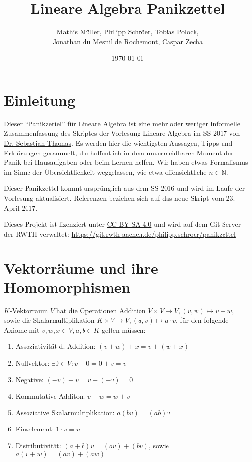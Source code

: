 \documentclass[a4paper,parskip=half*,DIV=15,fontsize=11pt]{scrartcl}
\title{Lineare Algebra Panikzettel}
\author{Mathis Müller, Philipp Schröer, Tobias Polock,\\ Jonathan du Mesnil de Rochemont, Caspar Zecha}
\date{\today}
\begin{document}
\maketitle

\setcounter{tocdepth}{2}
\tableofcontents

\section{Einleitung}

Dieser ``Panikzettel'' für Lineare Algebra ist eine mehr oder weniger informelle Zusammenfassung des Skriptes der Vorlesung Lineare Algebra im SS 2017 von \href{http://www.math.rwth-aachen.de/~Sebastian.Thomas/photo.jpg}{Dr. Sebastian Thomas}. Es werden hier die wichtigsten Aussagen, Tipps und Erklärungen gesammelt, die hoffentlich in dem unvermeidbaren Moment der Panik bei Hausaufgaben oder beim Lernen helfen. Wir haben etwas Formalismus im Sinne der Übersichtlichkeit weggelassen, wie etwa offensichtliche $n \in \mathbb{N}$.

Dieser Panikzettel kommt ursprünglich aus dem SS 2016 und wird im Laufe der Vorlesung aktualisiert. Referenzen beziehen sich auf das neue Skript vom 23. April 2017.

Dieses Projekt ist lizenziert unter \href{https://creativecommons.org/licenses/by-sa/4.0/}{CC-BY-SA-4.0} und wird auf dem Git-Server der RWTH verwaltet: \url{https://git.rwth-aachen.de/philipp.schroer/panikzettel}

\section{Vektorräume und ihre Homomorphismen}

$K$-Vektorraum $V$ hat die Operationen Addition  $V \times V \to V, (v,w) \mapsto v+w$, sowie die Skalarmultiplikation $K \times V \to V, (a,v) \mapsto a \cdot v  $, für den folgende Axiome mit $v, w, x \in V, a,b \in K$ gelten müssen:

\begin{enumerate}
\item Assoziativität d. Addition: $(v+w)+x = v+(w+x)$
\item Nullvektor: $\exists 0 \in V: v+0=0+v=v$
\item Negative: $(-v)+v=v+(-v)=0$
\item Kommutative Additon: $v+w=w+v$
\item Assoziative Skalarmultiplikation: $a(bv)=(ab)v$
\item Einselement: $1\cdot v=v$
\item Distributivität: $(a+b)v=(av)+(bv)$, sowie $a(v+w)=(av)+(aw)$
\end{enumerate}
\end{document}
